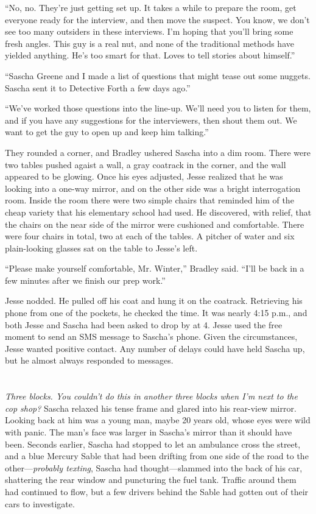 \documentclass[12pt]{book}
\begin{document}
``No, no.  They're just getting set up.  It takes a while to prepare the room, get everyone ready for the interview, and then move the suspect.  You know, we don't see too many outsiders in these interviews.  I'm hoping that you'll bring some fresh angles.  This guy is a real nut, and none of the traditional methods have yielded anything.  He's too smart for that.  Loves to tell stories about himself.''

``Sascha Greene and I made a list of questions that might tease out some nuggets.  Sascha sent it to Detective Forth a few days ago.''

``We've worked those questions into the line-up.  We'll need you to listen for them, and if you have any suggestions for the interviewers, then shout them out.  We want to get the guy to open up and keep him talking.''

They rounded a corner, and Bradley ushered Sascha into a dim room.  There were two tables pushed agaist a wall, a gray coatrack in the corner, and the wall appeared to be glowing.  Once his eyes adjusted, Jesse realized that he was looking into a one-way mirror, and on the other side was a bright interrogation room.  Inside the room there were two simple chairs that reminded him of the cheap variety that his elementary school had used.  He discovered, with relief, that the chairs on the near side of the mirror were cushioned and comfortable.  There were four chairs in total, two at each of the tables.  A pitcher of water and six plain-looking glasses sat on the table to Jesse's left.

``Please make yourself comfortable, Mr. Winter,'' Bradley said.  ``I'll be back in a few minutes after we finish our prep work.''

Jesse nodded.  He pulled off his coat and hung it on the coatrack.  Retrieving his phone from one of the pockets, he checked the time.  It was nearly 4:15 p.m., and both Jesse and Sascha had been asked to drop by at 4.  Jesse used the free moment to send an SMS message to Sascha's phone.  Given the circumstances, Jesse wanted positive contact.  Any number of delays could have held Sascha up, but he almost always responded to messages.

\chapter{}

\emph{Three blocks.  You couldn't do this in another \emph{three blocks} when I'm next to the cop shop?}  Sascha relaxed his tense frame and glared into his rear-view mirror.  Looking back at him was a young man, maybe 20 years old, whose eyes were wild with panic.  The man's face was larger in Sascha's mirror than it should have been.  Seconds earlier, Sascha had stopped to let an ambulance cross the street, and a blue Mercury Sable that had been drifting from one side of the road to the other---\emph{probably texting}, Sascha had thought---slammed into the back of his car, shattering the rear window and puncturing the fuel tank.  Traffic around them had continued to flow, but a few drivers behind the Sable had gotten out of their cars to investigate.
\end{document}
